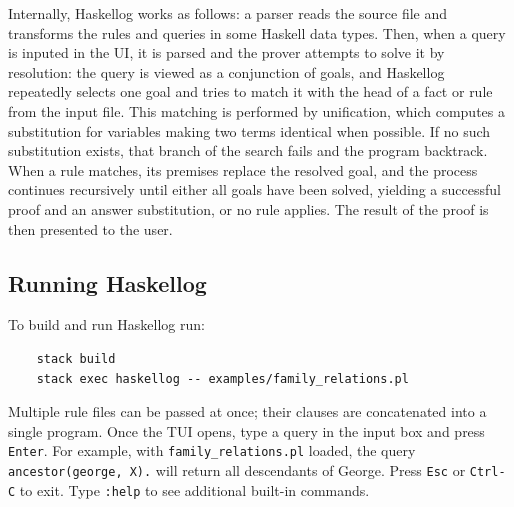 Internally, Haskellog works as follows: a parser reads the source file and transforms the rules and queries in some Haskell data types. Then, when a query is inputed in the UI, it is parsed and the prover attempts to solve it by resolution: the query is viewed as a conjunction of goals, and Haskellog repeatedly selects one goal and tries to match it with the head of a fact or rule from the input file. This matching is performed by unification, which computes a substitution for variables making two terms identical when possible. If no such substitution exists, that branch of the search fails and the program backtrack. When a rule matches, its premises replace the resolved goal, and the process continues recursively until either all goals have been solved, yielding a successful proof and an answer substitution, or no rule applies. The result of the proof is then presented to the user.

\subsection{Running Haskellog}

To build and run Haskellog run:
\begin{verbatim}
    stack build
    stack exec haskellog -- examples/family_relations.pl
\end{verbatim}
Multiple rule files can be passed at once; their clauses are concatenated into a single program.
Once the TUI opens, type a query in the input box and press \texttt{Enter}.
For example, with \texttt{family\_relations.pl} loaded, the query \verb|ancestor(george, X).| will return all descendants of George.
Press \texttt{Esc} or \texttt{Ctrl-C} to exit.
Type \verb|:help| to see additional built-in commands.

